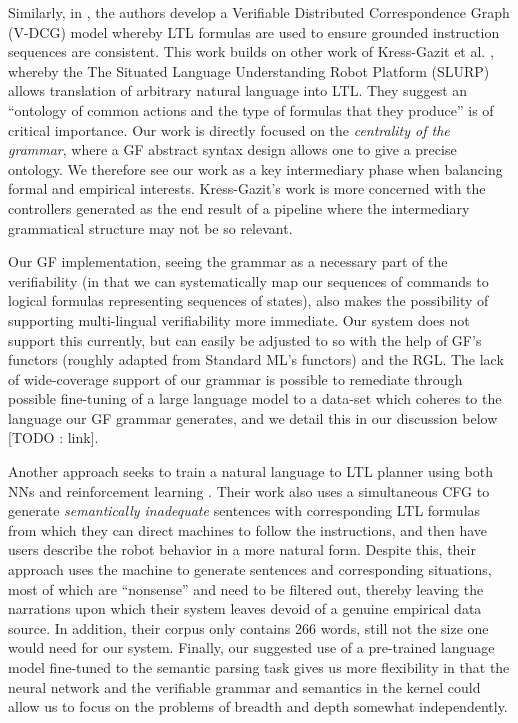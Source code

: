 \documentclass[a4paper, 11pt]{article}
\begin{document}
Similarly, in \cite{7759412}, the authors develop a Verifiable Distributed
Correspondence Graph (V-DCG) model whereby LTL formulas are used to ensure
grounded instruction sequences are consistent. This work builds on other work of
Kress-Gazit et al. \cite{provCorrectNatControl}, whereby the The Situated
Language Understanding Robot Platform (SLURP) allows translation of arbitrary
natural language into LTL. They suggest an ``ontology of common actions and the
type of formulas that they produce'' is of critical importance. Our work is
directly focused on the \emph{centrality of the grammar}, where a GF abstract
syntax design allows one to give a precise ontology. We therefore see our work as
a key intermediary phase when balancing formal and empirical interests.
Kress-Gazit's work is more concerned with the controllers generated as the end
result of a pipeline where the intermediary grammatical structure may not be so
relevant.

Our GF implementation, seeing the grammar as a necessary part of the
verifiability (in that we can systematically map our sequences of commands to
logical formulas representing sequences of states), also makes the possibility of
supporting multi-lingual verifiability more immediate. Our system does not
support this currently, but can easily be adjusted to so with the help of GF's
functors (roughly adapted from Standard ML's functors) and the RGL. The lack of wide-coverage
support of our grammar is possible to remediate through possible fine-tuning of
a large language model to a data-set which coheres to the language our GF
grammar generates, and we detail this in our discussion below [TODO : link].

Another approach seeks to train a natural language to LTL planner using both NNs
and reinforcement learning \cite{ltlSemParse}. Their work also uses a
simultaneous CFG to generate \emph{semantically inadequate} sentences with
corresponding LTL formulas from which they can direct machines to follow the
instructions, and then have users describe the robot behavior in a more natural
form. Despite this, their approach uses the machine to generate sentences and
corresponding situations, most of which are ``nonsense'' and need to be filtered
out, thereby leaving the narrations upon which their system leaves devoid of a
genuine empirical data source. In addition, their corpus only contains 266
words, still not the size one would need for our system. Finally, our suggested
use of a pre-trained language model fine-tuned to the semantic parsing task
gives us more flexibility in that the neural network and the verifiable grammar
and semantics in the kernel could allow us to focus on the problems of breadth
and depth somewhat independently.
\end{document}
